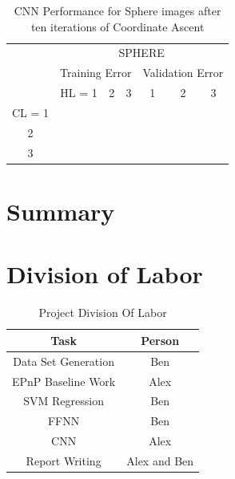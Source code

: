\documentclass[journal]{IEEEtran}
\begin{document}
\begin{table}[h]
	\caption{CNN Performance for Sphere images after ten iterations of Coordinate Ascent}
	\label{CNN_SPHERE_TABLE}
	\centering
	\begin{tabular}{|c|c|c|c||c|c|c|}
		\cline{2-7}
		\multicolumn{1}{c|}{} &	\multicolumn{6}{c|}{SPHERE}\\\cline{2-7}
		\multicolumn{1}{c|}{}&\multicolumn{3}{|c||}{Training Error}  &\multicolumn{3}{c|}{Validation Error} \\
		\cline{2-7}
		\multicolumn{1}{c|}{} & HL = 1 & 2 & 3 &1 & 2 & 3 \\
		\hline
		CL = 1	& & & 	& & & \\
		2	& & & & & & \\
		3	& & & & &  & \\
		\hline
		
		
	\end{tabular}
\end{table}


\section{Summary}

\section{Division of Labor}

\begin{table}[h]
	\caption{Project Division Of Labor}
	\label{SomeTable}
	\centering
	\begin{tabular}{|c|c|}
		\hline
		Task &  Person\\
		\hline
		Data Set Generation &  Ben\\
		
		EPnP Baseline Work &  Alex\\
		SVM Regression & Ben\\
		FFNN & Ben \\
		CNN & Alex\\
		Report Writing & Alex and Ben\\
		\hline
		
		
	\end{tabular}
\end{table}
\end{document}
